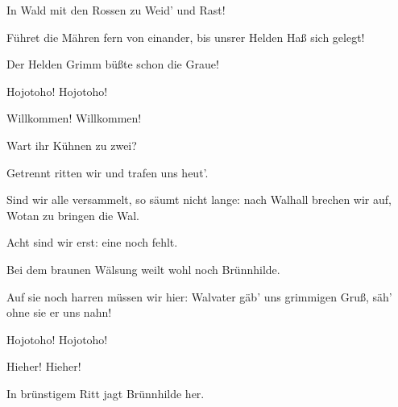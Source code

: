 \begin{drama}
\Gerhildespeaks


In Wald mit den Rossen zu Weid' und Rast!
 

\Ortlindespeaks


Führet die Mähren fern von einander,
bis unsrer Helden Haß sich gelegt!
 




\Helmwigespeaks


Der Helden Grimm büßte schon die Graue!
 






Hojotoho! Hojotoho!
 

Willkommen! Willkommen!
 

\Schwertleitespeaks
Wart ihr Kühnen zu zwei?
 

\Grimgerdespeaks
Getrennt ritten wir und trafen uns heut'.
 

\Rossweissespeaks
Sind wir alle versammelt, so säumt nicht lange:
nach Walhall brechen wir auf,
Wotan zu bringen die Wal.
 

\Helmwigespeaks
Acht sind wir erst: eine noch fehlt.
 

\Gerhildespeaks
Bei dem braunen Wälsung
weilt wohl noch Brünnhilde.
 

\Waltrautespeaks
Auf sie noch harren müssen wir hier:
Walvater gäb' uns grimmigen Gruß,
säh' ohne sie er uns nahn!
 

\Siegrunespeaks


Hojotoho! Hojotoho!
 



Hieher! Hieher!
 



In brünstigem Ritt
jagt Brünnhilde her.
 




\end{drama}
